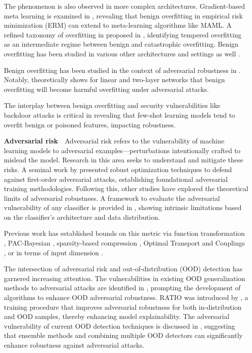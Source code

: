 The phenomenon is also observed in more complex architectures. Gradient-based meta learning is examined in \cite{chen2022understanding}, revealing that benign overfitting in empirical risk minimization (ERM) can extend to meta-learning algorithms like MAML. A refined taxonomy of overfitting in proposed in \cite{mallinar2022benign}, identifying tempered overfitting as an intermediate regime between benign and catastrophic overfitting. Benign overfitting has been studied in various other architectures and settings as well \cite{li2021towards, tsigler2023benign, wang2021benign, li2023benign, wang2021benign, kornowski2024tempered, meng2023benign}.

Benign overfitting has been studied in the context of adversarial robustness in \cite{hao2024surprising, chen2023benign, sanyal2020benign}. Notably, \cite{hao2024surprising} theoretically shows for linear and two-layer networks that benign overfitting will become harmful overfitting under adversarial attacks.


The interplay between benign overfitting and security vulnerabilities like backdoor attacks is critical in \cite{liu2024does} revealing that few-shot learning models tend to overfit benign or poisoned features, impacting robustness. 


\textbf{Adversarial risk}\ \  
Adversarial risk refers to the vulnerability of machine learning models to adversarial examples—perturbations intentionally crafted to mislead the model. Research in this area seeks to understand and mitigate these risks. A seminal work by \cite{madry2017towards} presented robust optimization techniques to defend against first-order adversarial attacks, establishing foundational adversarial training methodologies. Following this, other studies have explored the theoretical limits of adversarial robustness. A framework to evaluate the adversarial vulnerability of any classifier is provided in \cite{fawzi2018adversarial}, showing intrinsic limitations based on the classifier's architecture and data distribution.

Previous work has established bounds on this metric via function transformation \cite{khim2019adversarial}, PAC-Bayesian \cite{pmlr-v238-mustafa24a}, sparsity-based compression \cite{balda2019adversarial}, Optimal Transport and Couplings \cite{pmlr-v119-pydi20a}, or in terms of input dimension \cite{simon2019first}. 

The intersection of adversarial risk and out-of-distribution (OOD) detection has garnered increasing attention. The vulnerabilities in existing OOD generalization methods to adversarial attacks are identified in \cite{zou2024adversarial}, prompting the development of algorithms to enhance OOD adversarial robustness. RATIO was introduced by \cite{augustin2020adversarial}, a training procedure that improves adversarial robustness for both in-distribution and OOD samples, thereby enhancing model explainability. The adversarial vulnerability of current OOD detection techniques is discussed in \cite{fort2022adversarial}, suggesting that ensemble methods and combining multiple OOD detectors can significantly enhance robustness against adversarial attacks.

